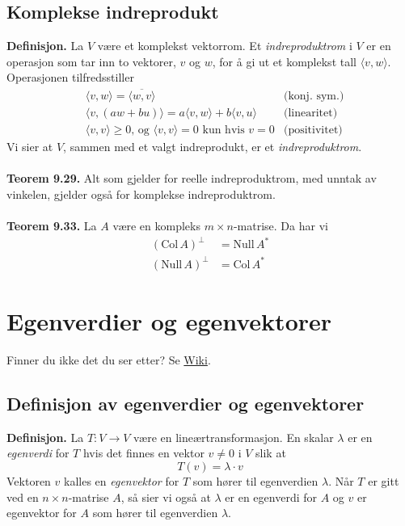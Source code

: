 \documentclass{article}
\begin{document}
\subsection{Komplekse indreprodukt}
\textbf{Definisjon.} La $V$ være et komplekst vektorrom. Et \textit{indreproduktrom} i $V$ er en operasjon som tar inn to vektorer, $v$ og $w$, for å gi ut et komplekst tall $\langle v, w \rangle$. Operasjonen tilfredsstiller
\begin{align*}
    &\langle v, w \rangle = \overline{ \langle w, v \rangle } &\text{(konj. sym.)} \\
    &\langle v, (aw + bu) \rangle = a \langle v, w \rangle + b \langle v, u \rangle &\text{(linearitet)} \\
    &\langle v, v \rangle \geq 0 \text{, og } \langle v, v \rangle = 0 \text{ kun hvis } v = 0 &\text{(positivitet)}
\end{align*}
Vi sier at $V$, sammen med et valgt indreprodukt, er et \textit{indreproduktrom}.
\\\\
\textbf{Teorem 9.29.} Alt som gjelder for reelle indreproduktrom, med unntak av vinkelen, gjelder også for komplekse indreproduktrom.
\\\\
\textbf{Teorem 9.33.} La $A$ være en kompleks $m \times n$-matrise. Da har vi
\begin{align*}
    (\text{Col}\,A)^\perp &= \text{Null}\,A^* \\
    (\text{Null}\,A)^\perp &= \text{Col}\,A^*
\end{align*}




\clearpage
\section{Egenverdier og egenvektorer}
Finner du ikke det du ser etter? Se \href{https://www.math.ntnu.no/emner/TMA4110/2020h/notater/10-egenverdier-og-egenvektorer.pdf}{Wiki}.


\subsection{Definisjon av egenverdier og egenvektorer}
\textbf{Definisjon.} La $T: V \rightarrow V$ være en lineærtransformasjon. En skalar $\lambda$ er en \textit{egenverdi} for $T$ hvis det finnes en vektor $v \neq 0$ i $V$ slik at
\[ T(v) = \lambda \cdot v \]
Vektoren $v$ kalles en \textit{egenvektor} for $T$ som hører til egenverdien $\lambda$. Når $T$ er gitt ved en $n \times n$-matrise $A$, så sier vi også at $\lambda$ er en egenverdi for $A$ og $v$ er egenvektor for $A$ som hører til egenverdien $\lambda$.
\end{document}
